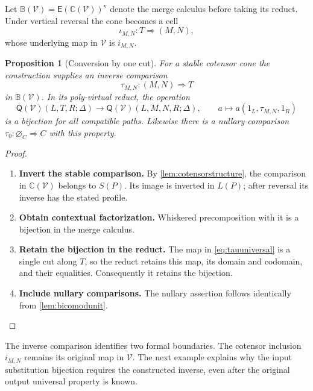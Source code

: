 \documentclass[11pt,reqno]{amsart}
\theoremstyle{plain}
\newtheorem{proposition}[theorem]{Proposition}
\theoremstyle{definition}
\theoremstyle{remark}
\numberwithin{equation}{section}
\newcommand{\V}{\mathcal V}
\newcommand{\E}{\mathsf E}
\newcommand{\Q}{\mathsf Q}
\newcommand{\Ccal}{\mathbb C}
\newcommand{\cell}{\mathrel{\Longrightarrow}}
\newcommand{\emp}[1]{\varnothing_{#1}}
\newcommand{\vop}{\mathrm v}
\begin{document}
Let $\mathbb B(\V)=\E(\Ccal(\V))^{\vop}$ denote the merge
calculus before taking its reduct. Under vertical reversal the cone
becomes a cell
\[
 \iota_{M,N}:T\cell(M,N),
\]
whose underlying map in $\V$ is $i_{M,N}$.

\begin{proposition}[Conversion by one cut]\label{prop:tau}
For a stable cotensor cone the construction supplies an inverse
comparison
\[
 \tau_{M,N}:(M,N)\cell T
\]
in $\mathbb B(\V)$. In its poly-virtual reduct, the operation
\begin{equation}\label{eq:tauuniversal}
 \Q(\V)(L,T,R;\Delta)\longrightarrow
 \Q(\V)(L,M,N,R;\Delta),\qquad
 a\longmapsto a(1_L,\tau_{M,N},1_R)
\end{equation}
is a bijection for all compatible paths. Likewise there is a nullary
comparison $\tau_0:\emp C\cell C$ with this property.
\end{proposition}
\begin{proof}\leavevmode
\begin{enumerate}
\item \textbf{Invert the stable comparison.} By \cref{lem:cotensorstructure}, the comparison in
$\Ccal(\V)$ belongs to $S(P)$. Its image is inverted in $L(P)$;
after reversal its inverse has the stated profile.

\item \textbf{Obtain contextual factorization.} Whiskered
precomposition with it is a bijection in the merge calculus.

\item \textbf{Retain the bijection in the reduct.} The map
in \cref{eq:tauuniversal} is a single cut along $T$, so the reduct
retains this map, its domain and codomain, and their equalities.
Consequently it retains the bijection.

\item \textbf{Include nullary comparisons.} The nullary assertion follows
identically from \cref{lem:bicomodunit}.\qedhere
\end{enumerate}
\end{proof}

The inverse comparison identifies two formal boundaries. The cotensor
inclusion $i_{M,N}$ remains its original map in $\V$. The next example
explains why the input substitution bijection requires the constructed
inverse, even after the original output universal property is known.
\end{document}
